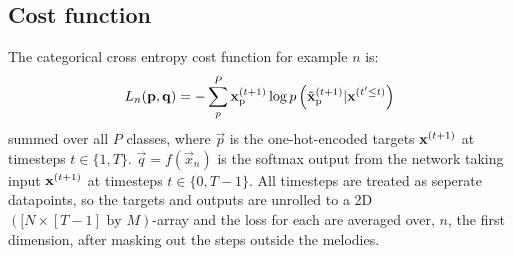 	\subsection{Cost function} 
	The categorical cross entropy cost function for example $n$ is:
	\begin{equation}
		L_n(\bm{\mathrm{p}}, \bm{\mathrm{q}}) = -\sum^{P}_{p} \bm{\mathrm{x}}^{(t+1)}_{\text{p}} \log p\left(\tilde{\bm{\mathrm{x}}}^{(t+1)}_{\text{p}}|\bm{\mathrm{x}}^{(t'\le t)}\right)
	\end{equation}
	summed over all $P$ classes, where $\vec{p}$ is the one-hot-encoded targets $\bm{\mathrm{x}}^{(t+1)}$ at timesteps $t\in\{1, T\}$. $\vec{q}=f(\vec{x}_n)$ is the softmax output from the network taking input $\bm{\mathrm{x}}^{(t+1)}$ at timesteps $t\in\{0, T-1\}$. All timesteps are treated as seperate datapoints, so the targets and outputs are unrolled to a 2D $([N \times [T-1] \text{ by } M)$-array and the loss for each are averaged over, $n$, the first dimension, after masking out the steps outside the melodies.







